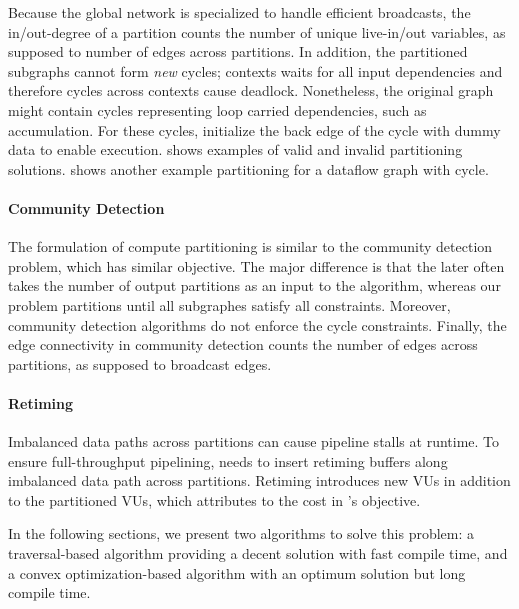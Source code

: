 Because the global network is specialized to handle efficient broadcasts, 
the in/out-degree of a partition counts the number of unique live-in/out variables, as supposed to
number of edges across partitions.
In addition, the partitioned subgraphs cannot form {\em new} cycles; contexts waits for all
input dependencies and therefore cycles across contexts cause deadlock. 
Nonetheless, the original graph might contain cycles representing loop carried dependencies, such as
accumulation. For these cycles, \name initialize the back edge of the cycle with dummy data to
enable execution.
 shows examples of valid and invalid partitioning solutions.
 shows another example partitioning for a dataflow graph with cycle.

\paragraph{Community Detection}
The formulation of compute partitioning is similar to the community detection problem\cite{community}, which has similar
objective. The major difference is that the later often takes the number of output partitions as an
input to the algorithm, whereas our problem partitions until all subgraphes satisfy all constraints.
Moreover, community detection algorithms do not enforce the cycle constraints. 
Finally, the edge connectivity in community detection counts the number of edges across partitions, as supposed to broadcast edges.

\paragraph{Retiming}
Imbalanced data paths across partitions can cause pipeline stalls at runtime.
To ensure full-throughput pipelining, \name needs to insert retiming buffers along imbalanced data path across
partitions.
Retiming introduces new VUs in addition to the partitioned VUs, which attributes to the cost in
's objective.

In the following sections, we present two algorithms to solve this problem:
a traversal-based algorithm providing a decent solution with fast compile time, and a convex
optimization-based algorithm with an optimum solution but long compile time.

